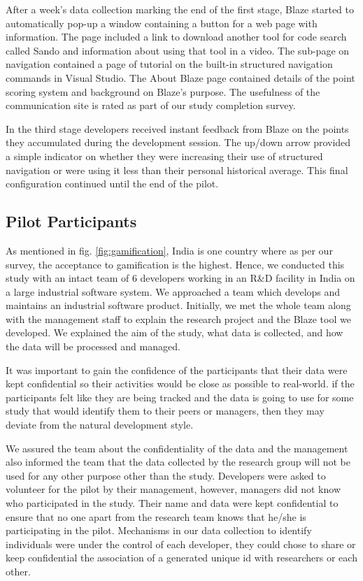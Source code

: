 \documentclass{sig-alternate}
\begin{document}
After a week's data collection marking the end of the first stage, Blaze started to automatically pop-up a window containing a button for a web page with information.  The page included a link to download another tool for code search called Sando \cite{Shepherd2012Sando} and information about using that tool in a video.  The sub-page on navigation contained a page of tutorial on the built-in structured navigation commands in Visual Studio.  The About Blaze page contained details of the point scoring system and background on Blaze's purpose.  The usefulness of the communication site is rated as part of our study completion survey.

In the third stage developers received instant feedback from Blaze on the points they accumulated during the development session.  The up/down arrow provided a simple indicator on whether they were increasing their use of structured navigation or were using it less than their personal historical average.  This final configuration continued until the end of the pilot.  

\subsection{Pilot Participants}

As mentioned in fig. \ref{fig:gamification}, India is one country where as per our survey, the acceptance to gamification is the highest. Hence, we conducted this study with an intact team of 6 developers working in an R\&D facility in India on a large industrial software system. We approached a team which develops and maintains an industrial software product. Initially, we met the whole team along with the management staff to explain the research project and the Blaze tool we developed. We  explained the aim of the study, what data is collected, and how the data will be processed and managed. 

It was important to gain the confidence of the participants that their data were kept confidential so their activities would be close as possible to real-world. if the participants felt like they are being tracked and the data is going to use for some study that would identify them to their peers or managers, then they may deviate from the natural development style.

We  assured the team about the confidentiality of the data and the management also informed the team that the data collected by the research group will not be used for any other purpose other than the study.  Developers were asked to volunteer for the pilot by their management, however, managers did not know who participated in the study. Their name and data were kept confidential to ensure that no one apart from the research team knows that he/she is participating in the pilot. Mechanisms in our data collection to identify individuals were under the control of each developer, they could chose to share or keep confidential the association of a generated unique id with researchers or each other.   
\end{document}
